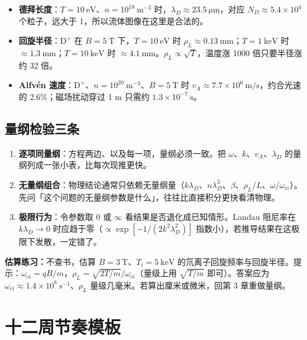 \begin{itemize}
\item \textbf{德拜长度}：$T=10\ \mathrm{eV}$、$n=10^{18}\ \mathrm{m^{-3}}$ 时，$\lambda_D\approx 23.5\ \mathrm{\mu m}$，对应 $N_D\approx 5.4\times 10^{4}$ 个粒子，远大于 1，所以流体图像在这里是合法的。
\item \textbf{回旋半径}：$\mathrm{D^+}$ 在 $B=5\ \mathrm{T}$ 下，$T=10\ \mathrm{eV}$ 时 $\rho_L\approx 0.13\ \mathrm{mm}$；$T=1\ \mathrm{keV}$ 时 $\approx 1.3\ \mathrm{mm}$；$T=10\ \mathrm{keV}$ 时 $\approx 4.1\ \mathrm{mm}$。$\rho_L\propto\sqrt{T}$，温度涨 1000 倍只要半径涨约 32 倍。
\item \textbf{Alfvén 速度}：$\mathrm{D^+}$、$n=10^{20}\ \mathrm{m^{-3}}$、$B=5\ \mathrm{T}$ 时 $v_A\approx 7.7\times 10^{6}\ \mathrm{m/s}$，约合光速的 2.6\%；磁场扰动穿过 1 m 只需约 $1.3\times 10^{-7}\ \mathrm{s}$。
\end{itemize}

\subsection{量纲检验三条}

\begin{enumerate}
\item \textbf{逐项同量纲}：方程两边、以及每一项，量纲必须一致。把 $\omega$、$k$、$v_A$、$\lambda_D$ 的量纲列成一张小表，比每次现推更快。
\item \textbf{无量纲组合}：物理结论通常只依赖无量纲量（$k\lambda_D$、$n\lambda_D^3$、$\beta$、$\rho_L/L$、$\omega/\omega_{ci}$）。先问「这个问题的无量纲参数是什么」，往往比直接积分更快看清物理。
\item \textbf{极限行为}：令参数取 $0$ 或 $\infty$ 看结果是否退化成已知情形。Landau 阻尼率在 $k\lambda_D\to 0$ 时应趋于零（$\propto\exp[-1/(2k^2\lambda_D^2)]$ 指数小），若推导结果在这极限下发散，一定错了。
\end{enumerate}

\begin{miniquiz}
\textbf{估算练习：}不查书，估算 $B=3\ \mathrm{T}$、$T_i=5\ \mathrm{keV}$ 的氘离子回旋频率与回旋半径。提示：$\omega_{ci}=qB/m$，$\rho_L=\sqrt{2T/m}/\omega_{ci}$（量级上用 $\sqrt{T/m}$ 即可）。答案应为 $\omega_{ci}\approx 1.4\times 10^{8}\ \mathrm{s^{-1}}$、$\rho_L$ 量级几毫米。若算出厘米或微米，回第 3 章重做量纲。
\end{miniquiz}


\section{十二周节奏模板}

